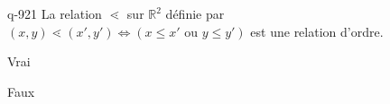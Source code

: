 \begin{truefalse}{q-921}
La relation $\lessdot$ sur $\mathbb R^2$ définie par $(x,y) \lessdot (x',y') \iff (x\leq x' \text{ ou } y\leq y')$ est une relation d'ordre.
\item Vrai
\item* Faux
\end{truefalse}

